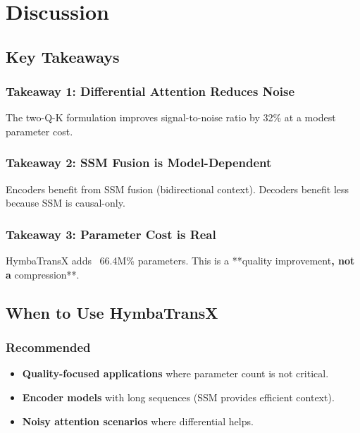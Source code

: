 \section{Discussion}

\subsection{Key Takeaways}

\subsubsection{Takeaway 1: Differential Attention Reduces Noise}

The two-Q-K formulation improves signal-to-noise ratio by 
32\% at a modest parameter cost.

\subsubsection{Takeaway 2: SSM Fusion is Model-Dependent}

Encoders benefit from SSM fusion (bidirectional context). Decoders benefit 
less because SSM is causal-only.

\subsubsection{Takeaway 3: Parameter Cost is Real}

HymbaTransX adds ~66.4M\% parameters. This is a **quality 
improvement\textbf{, not a }compression**.

\subsection{When to Use HymbaTransX}

\subsubsection{Recommended}
\begin{itemize}
\item \textbf{Quality-focused applications} where parameter count is not critical.
\item \textbf{Encoder models} with long sequences (SSM provides efficient context).
\item \textbf{Noisy attention scenarios} where differential helps.

\end{itemize}
